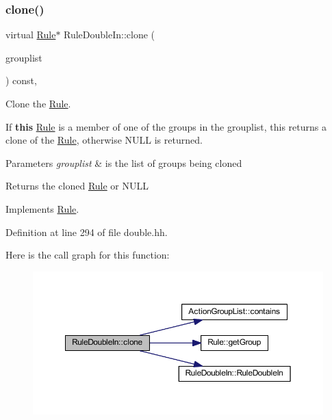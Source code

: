 \subsubsection{\texorpdfstring{clone()}{clone()}}
{\footnotesize\ttfamily virtual \mbox{\hyperlink{class_rule}{Rule}}$\ast$ Rule\+Double\+In\+::clone (\begin{DoxyParamCaption}\item[{const \mbox{\hyperlink{class_action_group_list}{Action\+Group\+List}} \&}]{grouplist }\end{DoxyParamCaption}) const\hspace{0.3cm}{\ttfamily [inline]}, {\ttfamily [virtual]}}



Clone the \mbox{\hyperlink{class_rule}{Rule}}. 

If {\bfseries{this}} \mbox{\hyperlink{class_rule}{Rule}} is a member of one of the groups in the grouplist, this returns a clone of the \mbox{\hyperlink{class_rule}{Rule}}, otherwise N\+U\+LL is returned. 
\begin{DoxyParams}{Parameters}
{\em grouplist} & is the list of groups being cloned \\
\hline
\end{DoxyParams}
\begin{DoxyReturn}{Returns}
the cloned \mbox{\hyperlink{class_rule}{Rule}} or N\+U\+LL 
\end{DoxyReturn}


Implements \mbox{\hyperlink{class_rule_a70de90a76461bfa7ea0b575ce3c11e4d}{Rule}}.



Definition at line 294 of file double.\+hh.

Here is the call graph for this function\+:
\nopagebreak
\begin{figure}[H]
\begin{center}
\leavevmode
\includegraphics[width=350pt]{class_rule_double_in_a43626154c6e567ac9b235f4f9c05439d_cgraph}
\end{center}
\end{figure}
\mbox{\label{class_rule_double_in_a4c7fdd07d59db8f10a120c8e4d839d9b}} 
